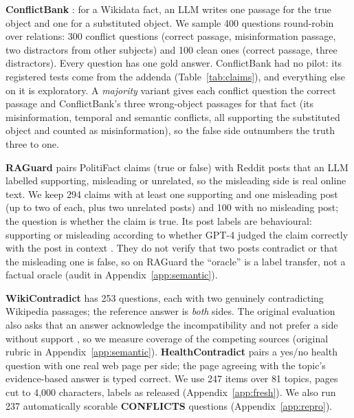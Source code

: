 \textbf{ConflictBank} \citep{su2024conflictbank}: for a Wikidata fact, an LLM writes one passage for the true
object and one for a substituted object. We sample 400 questions round-robin over relations: 300 conflict questions
(correct passage, misinformation passage, two distractors from other subjects) and 100 clean ones (correct passage,
three distractors). Every question has one gold answer. ConflictBank had no pilot: its registered tests come from the addenda (Table~\ref{tab:claims}), and everything else on it is exploratory. A
\emph{majority} variant gives each conflict question the correct passage and ConflictBank's three wrong-object
passages for that fact (its misinformation, temporal and semantic conflicts, all supporting the substituted object
and counted as misinformation), so the false side outnumbers the truth three to one.

\textbf{RAGuard} \citep{zeng2025raguard} pairs PolitiFact claims (true or false) with Reddit posts that an LLM
labelled supporting, misleading or unrelated, so the misleading side is real online text. We keep 294 claims with at
least one supporting and one misleading post (up to two of each, plus two unrelated posts) and 100 with no
misleading post; the question is whether the claim is true. Its post labels are behavioural: supporting or misleading according to whether GPT-4 judged the claim correctly with the post in context \citep[\S3.3]{zeng2025raguard}. They do not verify that two posts contradict or that the misleading one is false, so on RAGuard the ``oracle'' is a label transfer, not a factual oracle (audit in Appendix~\ref{app:semantic}).

\textbf{WikiContradict} \citep{hou2024wikicontradict} has 253 questions, each with two genuinely contradicting
Wikipedia passages; the reference answer is \emph{both} sides. The original evaluation also asks that an answer acknowledge the incompatibility and not prefer a side without support \citep[\S3.4]{hou2024wikicontradict}, so we measure coverage of the competing sources (original rubric in Appendix~\ref{app:semantic}). \textbf{HealthContradict} \citep{zhang2026healthcontradict} pairs a yes/no health question with one real web page per side; the page agreeing with the topic's evidence-based answer is typed correct. We use 247 items over 81 topics, pages cut to 4,000 characters, labels as released (Appendix~\ref{app:fresh}). We also run 237 automatically scorable
\textbf{CONFLICTS} \citep{cattan2025conflicts} questions (Appendix~\ref{app:repro}).

